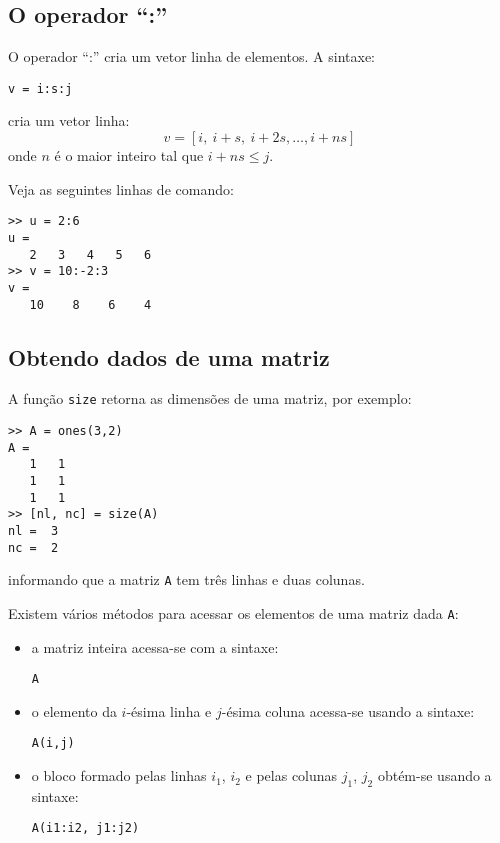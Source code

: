 \subsection{O operador ``:''}

O operador ``:'' cria um vetor linha de elementos. A sintaxe:
\begin{verbatim}
v = i:s:j
\end{verbatim}
cria um vetor linha:
\begin{equation*}
  v = [i,~i+s,~i+2s,\dotsc, i+ns]
\end{equation*}
onde $n$ é o maior inteiro tal que $i + ns \leq j$.

\begin{ex}
Veja as seguintes linhas de comando:
\begin{verbatim}
>> u = 2:6
u =
   2   3   4   5   6
>> v = 10:-2:3
v =
   10    8    6    4
\end{verbatim}
\end{ex}

\subsection{Obtendo dados de uma matriz}

A função \verb+size+ retorna as dimensões de uma matriz, por exemplo:
\begin{verbatim}
>> A = ones(3,2)
A =
   1   1
   1   1
   1   1 
>> [nl, nc] = size(A)
nl =  3
nc =  2
\end{verbatim}
informando que a matriz \verb+A+ tem três linhas e duas colunas.

Existem vários métodos para acessar os elementos de uma matriz dada \verb+A+:
\begin{itemize}
\item a matriz inteira acessa-se com a sintaxe:
\begin{verbatim}
A
\end{verbatim}
\item o elemento da $i$-ésima linha e $j$-ésima coluna acessa-se usando a sintaxe:
\begin{verbatim}
A(i,j)
\end{verbatim}
\item o bloco formado pelas linhas $i_1$, $i_2$ e pelas colunas $j_1$, $j_2$ obtém-se usando a sintaxe:
\begin{verbatim}
A(i1:i2, j1:j2)
\end{verbatim}
\end{itemize}

